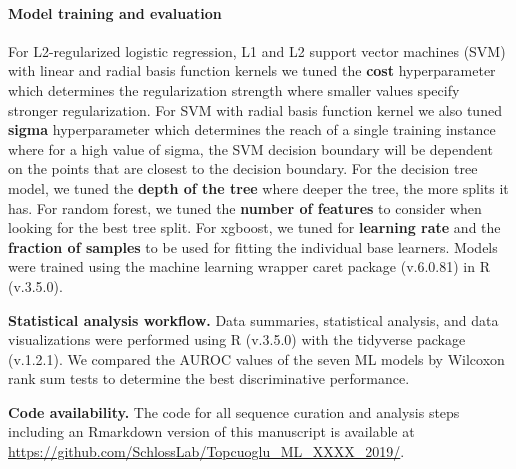 \documentclass[11pt,]{article}
\let\oldparagraph\paragraph
\renewcommand{\paragraph}[1]{\oldparagraph{#1}\mbox{}}
\begin{document}
\paragraph{Model training and
evaluation}\label{model-training-and-evaluation}

For L2-regularized logistic regression, L1 and L2 support vector
machines (SVM) with linear and radial basis function kernels we tuned
the \textbf{cost} hyperparameter which determines the regularization
strength where smaller values specify stronger regularization. For SVM
with radial basis function kernel we also tuned \textbf{sigma}
hyperparameter which determines the reach of a single training instance
where for a high value of sigma, the SVM decision boundary will be
dependent on the points that are closest to the decision boundary. For
the decision tree model, we tuned the \textbf{depth of the tree} where
deeper the tree, the more splits it has. For random forest, we tuned the
\textbf{number of features} to consider when looking for the best tree
split. For xgboost, we tuned for \textbf{learning rate} and the
\textbf{fraction of samples} to be used for fitting the individual base
learners. Models were trained using the machine learning wrapper caret
package (v.6.0.81) in R (v.3.5.0).

\textbf{Statistical analysis workflow.} Data summaries, statistical
analysis, and data visualizations were performed using R (v.3.5.0) with
the tidyverse package (v.1.2.1). We compared the AUROC values of the
seven ML models by Wilcoxon rank sum tests to determine the best
discriminative performance.

\textbf{Code availability.} The code for all sequence curation and
analysis steps including an Rmarkdown version of this manuscript is
available at
\url{https://github.com/SchlossLab/Topcuoglu_ML_XXXX_2019/}.

\newpage
\end{document}

